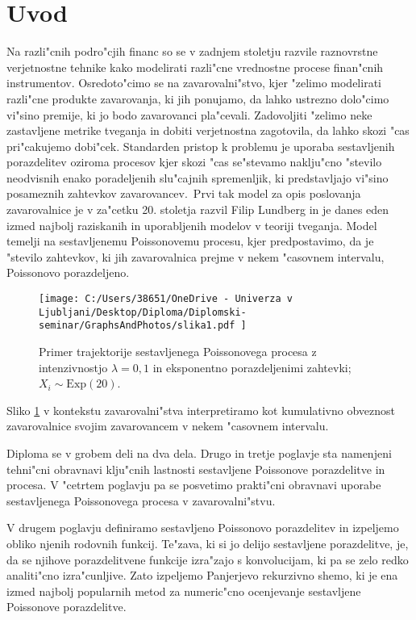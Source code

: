\documentclass[12pt, a4paper, reqno]{amsart}
\theoremstyle{definition}
\theoremstyle{plain}
\newcommand{\1}{\mathds{1}}
\begin{document}
\section{Uvod}
Na razli"cnih podro"cjih financ so se v zadnjem stoletju razvile raznovrstne verjetnostne tehnike kako 
modelirati razli"cne vrednostne procese finan"cnih instrumentov. Osredoto"cimo se na zavarovalni"stvo, 
kjer "zelimo modelirati razli"cne produkte zavarovanja, ki jih ponujamo, da lahko ustrezno dolo"cimo vi"sino premije, ki jo
bodo zavarovanci pla"cevali.  Zadovoljiti "zelimo neke zastavljene metrike tveganja in dobiti verjetnostna zagotovila, 
da lahko skozi "cas pri"cakujemo dobi"cek. 
Standarden pristop k problemu je uporaba sestavljenih porazdelitev oziroma procesov kjer skozi "cas se"stevamo naklju"cno "stevilo 
neodvisnih enako poradeljenih slu"cajnih spremenljik, ki predstavljajo vi"sino posameznih zahtevkov zavarovancev.\ Prvi tak model za opis
poslovanja zavarovalnice 
je v za"cetku 20. stoletja razvil Filip Lundberg in je danes eden izmed najbolj raziskanih in 
uporabljenih modelov v teoriji tveganja. Model temelji na sestavljenemu Poissonovemu procesu, kjer predpostavimo, da je "stevilo zahtevkov,
ki jih zavarovalnica prejme v nekem "casovnem intervalu, Poissonovo porazdeljeno.

    \begin{figure}[H]
        \centering
        \texttt{[image: 
            C:/Users/38651/OneDrive - Univerza v Ljubljani/Desktop/Diploma/Diplomski-seminar/GraphsAndPhotos/slika1.pdf
            ]}
        \caption{Primer trajektorije sestavljenega Poissonovega procesa z intenzivnostjo $\lambda = 0{,}1$ in
        eksponentno porazdeljenimi zahtevki; $X_i\sim\text{Exp}(20)$.}
        \label{fig:slika1}
    \end{figure}
    \noindent
    Sliko \ref{fig:slika1} v kontekstu zavarovalni"stva interpretiramo kot kumulativno obveznost zavarovalnice 
    svojim zavarovancem v nekem "casovnem intervalu. 

    Diploma se v grobem deli na dva dela. Drugo in tretje poglavje sta namenjeni tehni"cni obravnavi klju"cnih lastnosti 
    sestavljene Poissonove porazdelitve in procesa. V "cetrtem poglavju pa se posvetimo prakti"cni obravnavi uporabe sestavljenega
    Poissonovega procesa v zavarovalni"stvu. 

    V drugem poglavju definiramo sestavljeno Poissonovo porazdelitev in izpeljemo obliko njenih rodovnih funkcij.
    Te"zava, ki si jo delijo sestavljene porazdelitve, je, da se njihove porazdelitvene funkcije izra"zajo 
    s konvolucijam, ki pa se zelo redko analiti"cno izra"cunljive. Zato izpeljemo Panjerjevo rekurzivno shemo, ki 
    je ena izmed najbolj popularnih metod za numeric"cno ocenjevanje sestavljene Poissonove porazdelitve.
\end{document}
